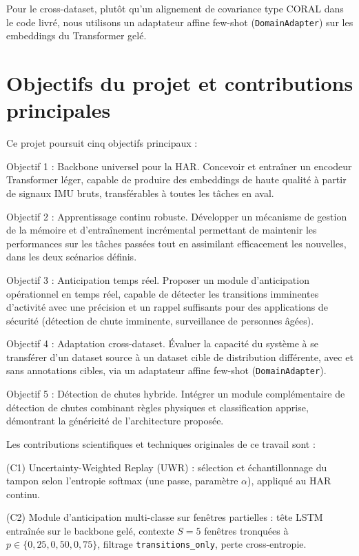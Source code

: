 Pour le cross-dataset, plutôt qu'un alignement de covariance type CORAL
dans le code livré, nous utilisons un adaptateur affine few-shot
(\texttt{DomainAdapter}) sur les embeddings du Transformer gelé.

\section{Objectifs du projet et contributions principales}

Ce projet poursuit cinq objectifs principaux :

Objectif 1 : Backbone universel pour la HAR. Concevoir et entraîner un encodeur Transformer léger, capable de produire des embeddings de haute qualité à partir de signaux IMU bruts, transférables à toutes les tâches en aval.

Objectif 2 : Apprentissage continu robuste. Développer un mécanisme de gestion de la mémoire et d'entraînement incrémental permettant de maintenir les performances sur les tâches passées tout en assimilant efficacement les nouvelles, dans les deux scénarios définis.

Objectif 3 : Anticipation temps réel. Proposer un module d'anticipation opérationnel en temps réel, capable de détecter les transitions imminentes d'activité avec une précision et un rappel suffisants pour des applications de sécurité (détection de chute imminente, surveillance de personnes âgées).

Objectif 4 : Adaptation cross-dataset. Évaluer la capacité du système à se transférer d'un dataset source à un dataset cible de distribution différente, avec et sans annotations cibles, via un adaptateur affine few-shot (\texttt{DomainAdapter}).

Objectif 5 : Détection de chutes hybride. Intégrer un module complémentaire de détection de chutes combinant règles physiques et classification apprise, démontrant la généricité de l'architecture proposée.

Les contributions scientifiques et techniques originales de ce travail sont :

(C1) Uncertainty-Weighted Replay (UWR) : sélection et échantillonnage du
tampon selon l'entropie softmax (une passe, paramètre $\alpha$), appliqué
au HAR continu.

(C2) Module d'anticipation multi-classe sur fenêtres partielles : tête LSTM
entraînée sur le backbone gelé, contexte $S=5$ fenêtres tronquées à
$p\in\{0{,}25,0{,}50,0{,}75\}$, filtrage \texttt{transitions\_only}, perte
cross-entropie.

